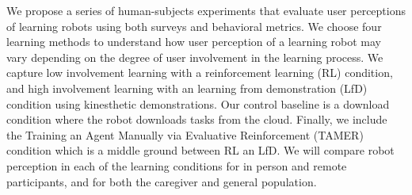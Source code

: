 \documentclass[letterpaper]{article} %
\begin{document}
We propose a series of human-subjects experiments that evaluate user perceptions of learning robots using both surveys and behavioral metrics. %
We choose four learning methods to understand how user perception of a learning robot may vary depending on the degree of user involvement in the learning process. We capture low involvement learning with a reinforcement learning (RL) condition, and high involvement learning with an learning from demonstration (LfD) condition using kinesthetic demonstrations. Our control baseline is a download condition where the robot downloads tasks from the cloud. Finally, we include the Training an Agent Manually via Evaluative Reinforcement (TAMER) \cite{knox2009interactively} condition which is a middle ground between RL an LfD. %
We will compare robot perception in each of the learning conditions for in person and remote participants, and for both the caregiver and general population.
\end{document}
